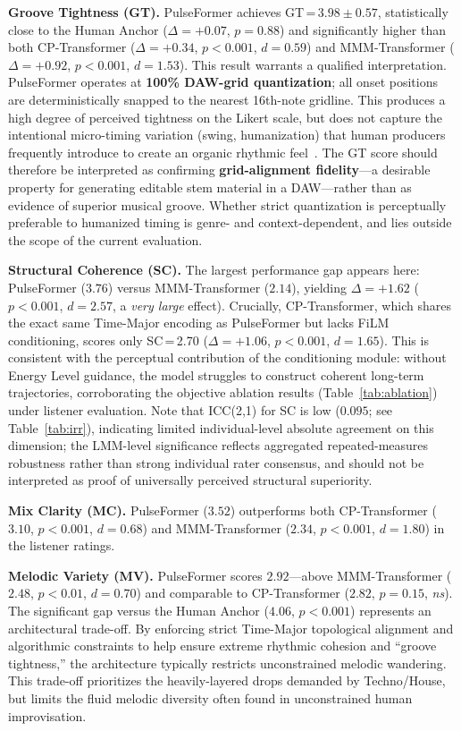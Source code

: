 \documentclass[pdflatex,sn-mathphys-num,twocolumn]{sn-jnl}
\theoremstyle{thmstyleone}
\theoremstyle{thmstyletwo}
\begin{document}
\textbf{Groove Tightness (GT).} PulseFormer achieves GT\,=\,$3.98\!\pm\!0.57$, statistically close to the Human Anchor ($\Delta=+0.07$, $p=0.88$) and significantly higher than both CP-Transformer ($\Delta=+0.34$, $p<0.001$, $d=0.59$) and MMM-Transformer ($\Delta=+0.92$, $p<0.001$, $d=1.53$). This result warrants a qualified interpretation. PulseFormer operates at \textbf{100\% DAW-grid quantization}; all onset positions are deterministically snapped to the nearest 16th-note gridline. This produces a high degree of perceived tightness on the Likert scale, but does not capture the intentional micro-timing variation (swing, humanization) that human producers frequently introduce to create an organic rhythmic feel~\cite{danielsen2006presence}. The GT score should therefore be interpreted as confirming \textbf{grid-alignment fidelity}---a desirable property for generating editable stem material in a DAW---rather than as evidence of superior musical groove. Whether strict quantization is perceptually preferable to humanized timing is genre- and context-dependent, and lies outside the scope of the current evaluation.

\textbf{Structural Coherence (SC).} The largest performance gap appears here: PulseFormer ($3.76$) versus MMM-Transformer ($2.14$), yielding $\Delta=+1.62$ ($p<0.001$, $d=2.57$, a \textit{very large} effect). Crucially, CP-Transformer, which shares the exact same Time-Major encoding as PulseFormer but lacks FiLM conditioning, scores only SC\,=\,2.70 ($\Delta=+1.06$, $p<0.001$, $d=1.65$). This is consistent with the perceptual contribution of the conditioning module: without Energy Level guidance, the model struggles to construct coherent long-term trajectories, corroborating the objective ablation results (Table~\ref{tab:ablation}) under listener evaluation. Note that ICC(2,1) for SC is low ($0.095$; see Table~\ref{tab:irr}), indicating limited individual-level absolute agreement on this dimension; the LMM-level significance reflects aggregated repeated-measures robustness rather than strong individual rater consensus, and should not be interpreted as proof of universally perceived structural superiority.

\textbf{Mix Clarity (MC).} PulseFormer ($3.52$) outperforms both CP-Transformer ($3.10$, $p<0.001$, $d=0.68$) and MMM-Transformer ($2.34$, $p<0.001$, $d=1.80$) in the listener ratings.

\textbf{Melodic Variety (MV).} PulseFormer scores $2.92$---above MMM-Transformer ($2.48$, $p<0.01$, $d=0.70$) and comparable to CP-Transformer ($2.82$, $p=0.15$, \textit{ns}). The significant gap versus the Human Anchor ($4.06$, $p<0.001$) represents an architectural trade-off. By enforcing strict Time-Major topological alignment and algorithmic constraints to help ensure extreme rhythmic cohesion and ``groove tightness,'' the architecture typically restricts unconstrained melodic wandering. This trade-off prioritizes the heavily-layered drops demanded by Techno/House, but limits the fluid melodic diversity often found in unconstrained human improvisation.
\end{document}
